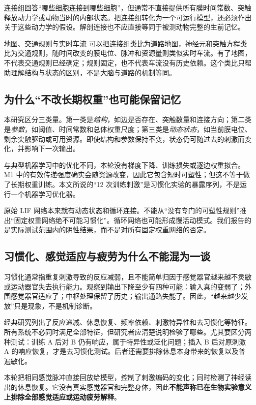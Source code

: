 连接组回答“哪些细胞连接到哪些细胞”，但通常不直接提供所有膜时间常数、突触释放动力学或动物当时的内部状态。把连接组转化为一个可运行模型，还必须作出关于这些动力学的假设。解剖连接也不应直接等同于被测动物完整的生前记忆。

\begin{primer}{地图、交通规则与实时车流}
可以把连接组类比为道路地图，神经元和突触方程类比为交通规则，随时间改变的膜电位、脉冲和资源量则类似实时车流。有了地图，不代表交通规则已经确定；规则固定，也不代表车流没有历史依赖。这个类比只帮助理解结构与状态的区别，不是大脑与道路的机制等同。
\end{primer}

\subsection{为什么“不改长期权重”也可能保留记忆}
本研究区分三类量。第一类是\emph{结构}，如边是否存在、突触数量和连接方向；第二类是\emph{参数}，如阈值、时间常数和总体权重尺度；第三类是\emph{动态状态}，如当前膜电位、剩余突触驱动或可用资源。即使结构和参数保持不变，状态仍可随过去的刺激而变化，并影响下一次输出。

与典型机器学习中的优化不同，本轮没有梯度下降、训练损失或逐边权重拟合。M1 中的有效传递强度确实会随资源改变，因此它包含短时可塑性；但这不等于做了长期权重训练。本文所说的“12 次训练刺激”是习惯化实验的暴露序列，不是运行一个机器学习优化器。

原始 LIF 网络本来就有动态状态和循环连接。不能从“没有专门的可塑性规则”推出“固定权重网络绝不可能习惯化”。循环网络也可能形成慢活动模式。我们报告的是实际测试范围内的阴性结果，而不是对所有固定权重网络的否定。

\subsection{习惯化、感觉适应与疲劳为什么不能混为一谈}
习惯化通常指重复刺激导致的反应减弱，且不能简单归因于感觉器官越来越不灵敏或运动器官失去执行能力\citep{rankin2009}。观察到输出下降至少有四种可能：输入真的变弱了；外围感觉器官适应了；中枢处理保留了历史；输出通路失能了。因此，“越来越少发放”只是现象，不是机制诊断。

经典研究列出了反应递减、休息恢复、频率依赖、刺激特异性和去习惯化等特征。所有系统不必同时满足全部特征，但研究者应清楚说明检验了哪些。尤其要区分两种测试：训练 A 后对 B 仍有响应，属于特异性或泛化问题；插入 B 后对原刺激 A 的响应恢复，才是去习惯化测试。后者还需要排除休息本身带来的恢复以及普遍敏化。

本轮把相同感觉脉冲直接回放给模型，控制了刺激编码的变化；同时检测了神经读出的休息恢复。它没有真实感觉器官和完整身体，因此\textbf{不能声称已在生物实验意义上排除全部感觉适应或运动疲劳解释}。

